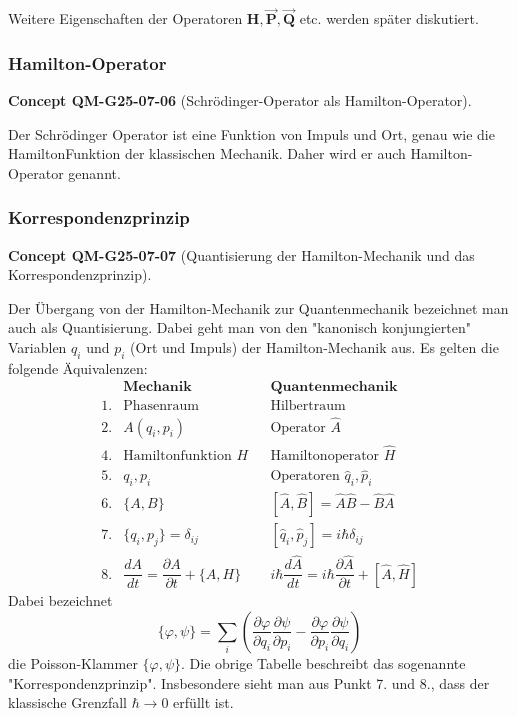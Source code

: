 \documentclass[10pt, letterpaper]{article}
\newcommand{\CustomHeading}[3]{%
  \par\medskip\noindent%
  \textbf{#1 #2} \textnormal{(#3)}.\enskip%
}
\newenvironment{CONC}[2]{\begin{unitbox}\CustomHeading{Concept}{#1}{#2}}{\end{unitbox}}
\begin{document}
Weitere Eigenschaften der Operatoren $\mathbf{H}, \overrightarrow{\mathbf{P}}, \overrightarrow{\mathbf{Q}}$ etc. werden später diskutiert.



\subsubsection*{Hamilton-Operator}


\begin{CONC}{QM-G25-07-06}{Schrödinger-Operator als Hamilton-Operator}
Der Schrödinger Operator ist eine Funktion von Impuls und Ort, genau wie die HamiltonFunktion der klassischen Mechanik. Daher wird er auch Hamilton-Operator genannt.
\end{CONC}

\subsubsection*{Korrespondenzprinzip}


\begin{CONC}{QM-G25-07-07}{Quantisierung der Hamilton-Mechanik und das Korrespondenzprinzip}
Der Übergang von der Hamilton-Mechanik zur Quantenmechanik bezeichnet man auch als Quantisierung. Dabei geht man von den "kanonisch konjungierten" Variablen $q_{i}$ und $p_{i}$ (Ort und Impuls) der Hamilton-Mechanik aus. Es gelten die folgende Äquivalenzen:
\[
\begin{array}{rlrl}
 &\textbf{Mechanik} & &\textbf{Quantenmechanik} \\
1. & \text{Phasenraum} & & \text{Hilbertraum} \\
2. & A(q_i, p_i) & & \text{Operator } \hat{A} \\
4. & \text{Hamiltonfunktion } H & & \text{Hamiltonoperator } \hat{H} \\
5. & q_i, p_i & & \text{Operatoren } \hat{q}_i, \hat{p}_i \\
6. & \{A, B\} & & [\hat{A}, \hat{B}] = \hat{A} \hat{B} - \hat{B} \hat{A} \\
7. & \{q_i, p_j\} = \delta_{ij} & & [\hat{q}_i, \hat{p}_j] = i\hbar \delta_{ij} \\
8. & \dfrac{dA}{dt} = \dfrac{\partial A}{\partial t} + \{A, H\}
   & & i\hbar \dfrac{d \hat{A}}{dt} = i\hbar \dfrac{\partial \hat{A}}{\partial t} + [\hat{A}, \hat{H}]
\end{array}
\]
Dabei bezeichnet
$$
\{\varphi, \psi\}=\sum_{i}\left(\frac{\partial \varphi}{\partial q_{i}} \frac{\partial \psi}{\partial p_{i}}-\frac{\partial \varphi}{\partial p_{i}} \frac{\partial \psi}{\partial q_{i}}\right)
$$
die Poisson-Klammer $\{\varphi, \psi\}$. Die obrige Tabelle beschreibt das sogenannte "Korrespondenzprinzip". Insbesondere sieht man aus Punkt 7. und 8., dass der klassische Grenzfall $\hbar \rightarrow 0$ erfüllt ist.
\end{CONC}
\end{document}

